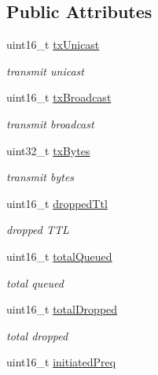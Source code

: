 \subsection*{Public Attributes}
\begin{DoxyCompactItemize}
\item 
uint16\+\_\+t \hyperlink{structns3_1_1dot11s_1_1HwmpProtocol_1_1Statistics_a7d9d31219b5c2b3a713ba09ddd43044a}{tx\+Unicast}
\begin{DoxyCompactList}\small\item\em transmit unicast \end{DoxyCompactList}\item 
uint16\+\_\+t \hyperlink{structns3_1_1dot11s_1_1HwmpProtocol_1_1Statistics_a49bb09b5b0893eebcc853b112afff30f}{tx\+Broadcast}
\begin{DoxyCompactList}\small\item\em transmit broadcast \end{DoxyCompactList}\item 
uint32\+\_\+t \hyperlink{structns3_1_1dot11s_1_1HwmpProtocol_1_1Statistics_a507c7a9383e255dd2402d42c8218b416}{tx\+Bytes}
\begin{DoxyCompactList}\small\item\em transmit bytes \end{DoxyCompactList}\item 
uint16\+\_\+t \hyperlink{structns3_1_1dot11s_1_1HwmpProtocol_1_1Statistics_ae53d393593feddd05de8b1a68793237a}{dropped\+Ttl}
\begin{DoxyCompactList}\small\item\em dropped T\+TL \end{DoxyCompactList}\item 
uint16\+\_\+t \hyperlink{structns3_1_1dot11s_1_1HwmpProtocol_1_1Statistics_a23f321f49ba13d78a633fd374383378b}{total\+Queued}
\begin{DoxyCompactList}\small\item\em total queued \end{DoxyCompactList}\item 
uint16\+\_\+t \hyperlink{structns3_1_1dot11s_1_1HwmpProtocol_1_1Statistics_a10f7af4034c326fc11df2942321e36f2}{total\+Dropped}
\begin{DoxyCompactList}\small\item\em total dropped \end{DoxyCompactList}\item 
uint16\+\_\+t \hyperlink{structns3_1_1dot11s_1_1HwmpProtocol_1_1Statistics_ae6bc34aa4c7963585fdd71ef98f8d6b5}{initiated\+Preq}

\end{DoxyCompactItemize}
